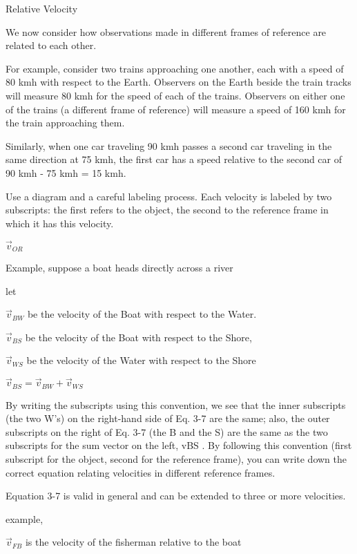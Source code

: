 \documentclass{extarticle}
\begin{document}
\begin{tcolorbox}[enhanced jigsaw,sharp corners,coltext=black,colback=BurntOrange!25!white,boxrule=0pt,breakable,size=minimal]

Relative Velocity

We now consider how observations made in different frames of reference are related to each other.

For example, consider two trains approaching one another, each with a speed of 80 kmh with respect to the Earth.
Observers on the Earth beside the train tracks will measure 80 kmh for the speed of each of the trains.
Observers on either one of the trains (a different frame of reference) will measure a speed of 160 kmh for the train approaching them.

Similarly, when one car traveling 90 kmh passes a second car traveling in the same direction at 75 kmh, the first car has a speed relative to the second car of 90 kmh - 75 kmh = 15 kmh.


Use a diagram and a careful labeling process. Each velocity is labeled by two subscripts: the first refers to the object, the second to the reference frame in which it has this velocity.

$\vec{v}_{OR}$

Example, suppose a boat heads directly across a river

let

$\vec{v}_{BW}$ be the velocity of the Boat with respect to the Water.

$\vec{v}_{BS}$ be the velocity of the Boat with respect to the Shore, 

$\vec{v}_{WS}$ be the velocity of the Water with respect to the Shore 


$\vec{v}_{BS} = \vec{v}_{BW} + \vec{v}_{WS}$


By writing the subscripts using this convention, we see that the inner subscripts (the two W's) on the right-hand side of Eq. 3-7 are the same; also, the outer subscripts on the right of Eq. 3-7 (the B and the S) are the same as the two subscripts for the sum vector on the left, vBS . By following this convention (first subscript for the object, second for the reference frame), you can write down the correct equation relating velocities in different reference frames.


Equation 3-7 is valid in general and can be extended to three or more velocities. 

example, 

$\vec{v}_{FB}$ is the velocity of the fisherman relative to the boat


\end{tcolorbox}
\end{document}

